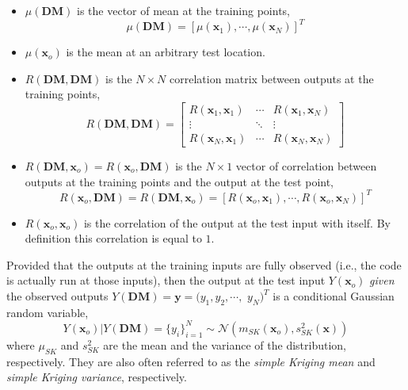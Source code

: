 \begin{itemize}
	\item $\mu(\mathbf{DM})$ is the vector of mean at the training points,
		\begin{equation}
			\mu(\mathbf{DM}) = [\mu(\mathbf{x}_1), \cdots, \mu(\mathbf{x}_N)]^T 
		\label{eq:training_mean_vector}
		\end{equation}
	\item $\mu(\mathbf{x}_o)$ is the mean at an arbitrary test location.
	\item $R(\mathbf{DM}, \mathbf{DM})$ is the $N \times N$ correlation matrix between outputs at the training points,
		\begin{equation}
			R(\mathbf{DM}, \mathbf{DM}) = 
				\begin{bmatrix}
					R(\mathbf{x}_1, \mathbf{x}_1) & \cdots												& R(\mathbf{x}_1, \mathbf{x}_N) \\
					\vdots												& \ddots												&	\vdots \\
					R(\mathbf{x}_N, \mathbf{x}_1)	&	\cdots                        & R(\mathbf{x}_N, \mathbf{x}_N)
				\end{bmatrix}
		\label{eq:training_correlation_matrix}
		\end{equation}
	\item $R(\mathbf{DM}, \mathbf{x}_o) = R(\mathbf{x}_o, \mathbf{DM})$ is the $N \times 1$ vector of correlation between outputs at the training points and the output at the test point,
			\begin{equation}
				R(\mathbf{x}_o, \mathbf{DM}) = R(\mathbf{DM}, \mathbf{x}_o) =  [R(\mathbf{x}_o, \mathbf{x}_1), \cdots, R(\mathbf{x}_o, \mathbf{x}_N)]^T
			\label{eq:training_test_correlation}
			\end{equation}
		\item $R(\mathbf{x}_o, \mathbf{x}_o)$ is the correlation of the output at the test input with itself. By definition this correlation is equal to $1$.
\end{itemize}

Provided that the outputs at the training inputs are fully observed (i.e., the code is actually run at those inputs),
then the output at the test input $Y(\mathbf{x}_o)$ \emph{given	} the observed outputs $Y(\mathbf{DM}) = \mathbf{y} = (y_1, y_2, \cdots,$ 
$y_N)^T$ is a conditional Gaussian random variable,
\begin{equation}
	Y(\mathbf{x}_o) | Y(\mathbf{DM}) = \{y_i\}_{i=1}^N \sim \mathcal{N} \left( m_{SK}(\mathbf{x}_o), s^2_{SK}(\mathbf{x})\right)
\label{eq:joint_training_test}
\end{equation}
where $\mu_{SK}$ and $s^2_{SK}$ are the mean and the variance of the distribution, respectively.
They are also often referred to as the \emph{simple Kriging mean} and \emph{simple Kriging variance}, respectively.

